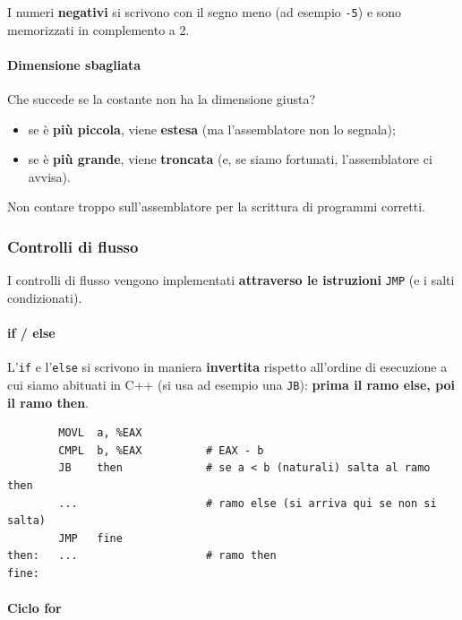 \documentclass[11pt,a4paper]{article}
\begin{document}
\begin{integrazione}
I numeri \textbf{negativi} si scrivono con il segno meno (ad esempio \texttt{-5}) e sono memorizzati in complemento a 2.
\end{integrazione}

\paragraph*{Dimensione sbagliata}

Che succede se la costante non ha la dimensione giusta?
\begin{itemize}[leftmargin=*]
  \item se è \textbf{più piccola}, viene \textbf{estesa} (ma l'assemblatore non lo segnala);
  \item se è \textbf{più grande}, viene \textbf{troncata} (e, se siamo fortunati, l'assemblatore ci avvisa).
\end{itemize}

\begin{nota}[Attenzione]
Non contare troppo sull'assemblatore per la scrittura di programmi corretti.
\end{nota}

\subsubsection*{Controlli di flusso}

I controlli di flusso vengono implementati \textbf{attraverso le istruzioni} \texttt{JMP} (e i salti condizionati).

\paragraph*{if / else}

L'\texttt{if} e l'\texttt{else} si scrivono in maniera \textbf{invertita} rispetto all'ordine di esecuzione a cui siamo abituati in C++ (si usa ad esempio una \texttt{JB}): \textbf{prima il ramo else, poi il ramo then}.

\begin{lstlisting}
        MOVL  a, %EAX
        CMPL  b, %EAX          # EAX - b
        JB    then             # se a < b (naturali) salta al ramo then
        ...                    # ramo else (si arriva qui se non si salta)
        JMP   fine
then:   ...                    # ramo then
fine:
\end{lstlisting}

\paragraph*{Ciclo for}
\end{document}
